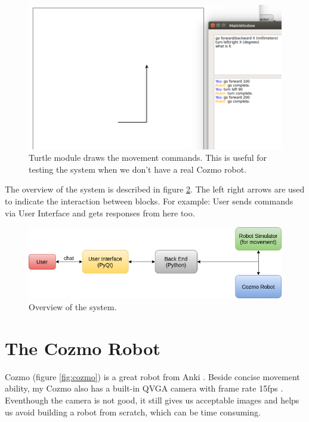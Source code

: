 \begin{figure}[!htb]
	\centering
	\includegraphics[width=0.8\hsize]{./figures/simulator}
	\caption{Turtle module draws the movement commands. This is useful for testing the system when we don't have a real Cozmo robot.}
	\label{fig:simulator}
\end{figure}

The overview of the system is described in figure \ref{fig:UIdesign}. The left right arrows are used to indicate the interaction between blocks. For example: User sends commands via User Interface and gets responses from here too.

\begin{figure}[!htb]
	\centering
	\includegraphics[width=1.0\hsize]{./figures/UIdesign}
	\caption{Overview of the system.}
	\label{fig:UIdesign}
\end{figure}

\section{The Cozmo Robot}
\label{sec:Cozmo}

Cozmo (figure \ref{fig:cozmo}) is a great robot from Anki \cite{AnkiOfficial:2017}. Beside concise movement ability, my Cozmo also has a built-in QVGA camera with frame rate 15fps \cite{cozmoTech}. Eventhough the camera is not good, it still gives us acceptable images and helps us avoid building a robot from scratch, which can be time consuming.

